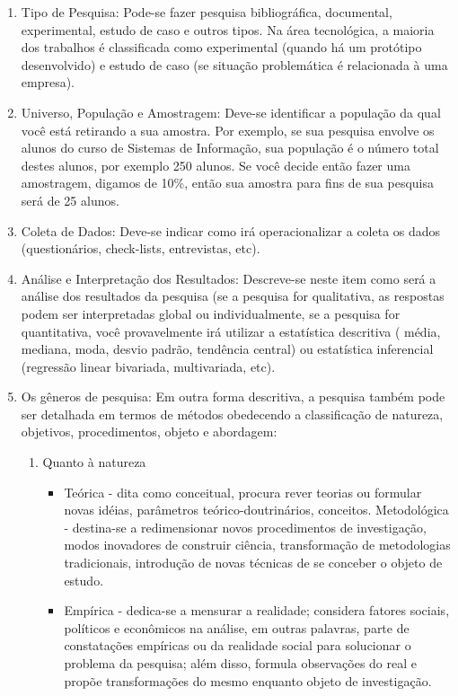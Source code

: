 \documentclass[
12pt,				%
openright,			%
oneside,
a4paper,			%
english,			%
french,				%
spanish,			%
brazil,				%
]{abntex2}
\begin{document}
	\begin{enumerate}
		\item
		Tipo de Pesquisa: Pode-se fazer pesquisa bibliográfica, documental, experimental, estudo de caso e outros tipos. Na área tecnológica, a maioria dos trabalhos é classificada como experimental (quando há um protótipo desenvolvido) e estudo de caso (se situação problemática é relacionada à uma empresa).
		\item
		Universo, População e Amostragem:
		Deve-se identificar a população da qual você está retirando a sua amostra. Por exemplo, se sua pesquisa envolve os alunos do curso de Sistemas de Informação, sua população é o número total destes alunos, por exemplo 250 alunos. Se você decide então fazer uma amostragem, digamos de 10\%, então sua amostra para fins de sua pesquisa será de 25 alunos.
		\item
		Coleta de Dados:
		Deve-se indicar como irá operacionalizar a coleta os dados (questionários, check-lists, entrevistas, etc).
		\item
		Análise e Interpretação dos Resultados:
		Descreve-se neste item como será a análise dos resultados da pesquisa (se a pesquisa for qualitativa, as respostas podem ser interpretadas global ou individualmente, se a pesquisa for  quantitativa, você provavelmente irá utilizar a estatística descritiva ( média, mediana, moda, desvio padrão, tendência central) ou estatística inferencial (regressão linear bivariada, multivariada, etc).
		\item
		Os gêneros de pesquisa:
		Em outra forma descritiva, a pesquisa também pode ser detalhada em termos de métodos obedecendo a classificação de natureza, objetivos, procedimentos, objeto e abordagem:
		\begin{enumerate}
			\item	Quanto à natureza
			\begin{itemize}
				\item Teórica - dita como conceitual, procura rever teorias ou formular novas idéias, parâmetros teórico-doutrinários, conceitos.
				Metodológica - destina-se a redimensionar novos procedimentos de investigação, modos inovadores de construir ciência, transformação de metodologias tradicionais, introdução de novas técnicas de se conceber o objeto de estudo.
				\item Empírica - dedica-se a mensurar a realidade; considera fatores sociais, políticos e econômicos na análise, em outras palavras, parte de constatações empíricas ou da realidade social para solucionar o problema da pesquisa; além disso, formula observações do real e propõe transformações do mesmo enquanto objeto de investigação.

\end{itemize}
\end{enumerate}
\end{enumerate}
\end{document}
